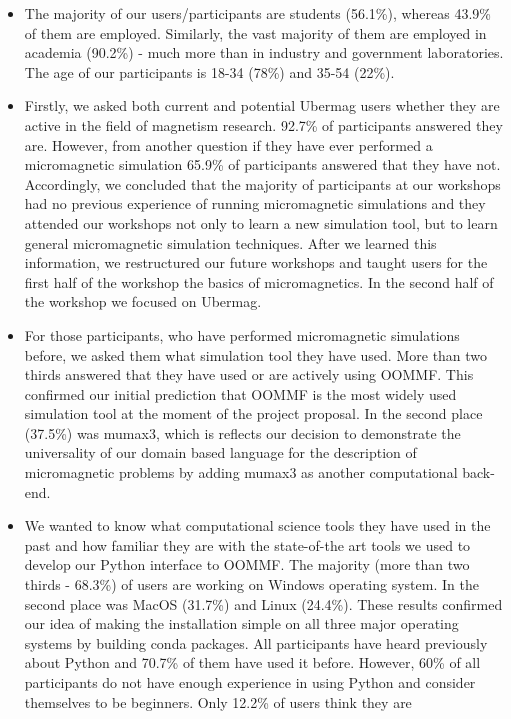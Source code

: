 \documentclass{deliverablereport}
\begin{document}
\begin{itemize}
  \item The majority of our users/participants are students (56.1\%),
whereas 43.9\% of them are employed. Similarly, the vast majority of
them are employed in academia (90.2\%) - much more than in industry
and government laboratories. The age of our participants is 18-34 (78\%) and
35-54 (22\%).
\item Firstly, we asked both current and potential Ubermag users
whether they are active in the field of magnetism research. 92.7\% of
participants answered they are. However, from another question if they
have ever performed a micromagnetic simulation 65.9\% of participants
answered that they have not. Accordingly, we concluded that the
majority of participants at our workshops had no previous experience
of running micromagnetic simulations and they attended our workshops
not only to learn a new simulation tool, but to learn general
micromagnetic simulation techniques. After we learned this
information, we restructured our future workshops and taught users for
the first half of the workshop the basics of micromagnetics. In the
second half of the workshop we focused on Ubermag.
\item For those participants, who have performed micromagnetic
simulations before, we asked them what simulation tool they have
used. More than two thirds answered that they have used or are
actively using OOMMF. This confirmed our initial prediction that OOMMF
is the most widely used simulation tool at the moment of the project
proposal. In the second place (37.5\%) was mumax3, which is reflects
our decision to demonstrate the universality of our domain
based language for the description of micromagnetic problems by adding
mumax3 as another computational back-end.
\item We wanted to know what computational science tools they
have used in the past and how familiar they are with the state-of-the
art tools we used to develop our Python interface to OOMMF. The
majority (more than two thirds - 68.3\%) of users are working on
Windows operating system. In the second place was MacOS (31.7\%) and
Linux (24.4\%). These results confirmed our idea of making the
installation simple on all three major operating systems by building
conda packages. All participants have heard previously about Python
and 70.7\% of them have used it before. However, 60\% of all
participants do not have enough experience in using Python and
consider themselves to be beginners. Only 12.2\% of users think they are

\end{itemize}
\end{document}
